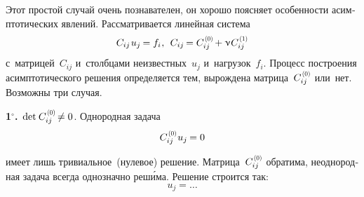 

\begin{otherlanguage}{russian}

Этот простой случай очень познавателен, он хорошо поясняет особенности асимптотических явлений. Рассматривается линейная система
\begin{equation}
C_{ij} \hspace{.2ex} u_{j} \hspace{-0.16ex} = f_{i} \hspace{.1ex} , \:\:
C_{ij} \hspace{-0.2ex} = C_{ij}^{\hspace{0.2ex}\scalebox{0.66}[0.66]{(0)}} \hspace{-0.2ex} + \smallparameter \hspace{.1ex} C_{ij}^{\hspace{0.2ex}\scalebox{0.66}[0.66]{(1)}}
\end{equation}
\noindent с~матрицей~$C_{ij}$ и~столбцами неизвестных~$u_j$ и~нагрузок~$f_i$. Процесс построения асимптотического решения определяется тем, вырождена матрица~${C_{ij}^{\hspace{0.2ex}\scalebox{0.66}[0.66]{(0)}}}$ или~нет. Возможны три случая.

\indent \textbf{1$^{\circ}$\hspace{-1ex}.}\, ${\operatorname{det} \hspace{.16ex} C_{ij}^{\hspace{0.2ex}\scalebox{0.66}[0.66]{(0)}} \hspace{-0.25ex} \neq 0}$. Однородная задача
\vspace{-0.2em}\begin{equation}
C_{ij}^{\hspace{0.2ex}\scalebox{0.66}[0.66]{(0)}} \hspace{.1ex} u_{j} \hspace{-0.16ex} = 0
\end{equation}

\vspace{-0.5em} \noindent имеет лишь тривиальное~(нулевое) решение.
Матрица~${C_{ij}^{\hspace{0.2ex}\scalebox{0.66}[0.66]{(0)}}}$ обратима, неоднородная задача всегда однозначно реш\'{и}ма. Решение строится так:
\begin{equation}
u_{j} = \ldots
\end{equation}


\end{otherlanguage}
